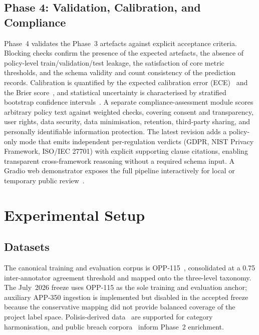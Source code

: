 \documentclass[conference]{IEEEtran}
\begin{document}
\subsection{Phase 4: Validation, Calibration, and Compliance}\label{sec:phase4}
Phase~4 validates the Phase~3 artefacts against explicit acceptance criteria.
Blocking checks confirm the presence of the expected artefacts, the absence
of policy-level train/validation/test leakage, the satisfaction of core
metric thresholds, and the schema validity and count consistency of the
prediction records. Calibration is quantified by the expected calibration
error (ECE)~\cite{guo2017calibration} and the Brier
score~\cite{brier1950verification}, and statistical uncertainty is
characterised by stratified bootstrap confidence
intervals~\cite{efron1993bootstrap}. A separate compliance-assessment module
scores arbitrary policy text against weighted checks, covering consent and
transparency, user rights, data security, data minimisation, retention,
third-party sharing, and personally identifiable information protection.
The latest revision adds a policy-only mode that emits independent
per-regulation verdicts (GDPR, NIST Privacy Framework, ISO/IEC 27701)
with explicit supporting clause citations, enabling transparent
cross-framework reasoning without a required schema input. A Gradio web
demonstrator exposes the full pipeline interactively for local or temporary
public review~\cite{gradio_docs,huggingface_spaces_docs}.

\section{Experimental Setup}\label{sec:setup}
\subsection{Datasets}
The canonical training and evaluation corpus is OPP-115~\cite{wilson2016opp115,opp115_dataset},
consolidated at a 0.75 inter-annotator agreement threshold and mapped onto
the three-level taxonomy. The July~2026 freeze uses OPP-115 as the sole
training and evaluation anchor; auxiliary APP-350 ingestion is implemented
but disabled in the accepted freeze because the conservative mapping did not
provide balanced coverage of the project label space. Polisis-derived
data~\cite{harkous2018polisis} are supported for category harmonisation, and
public breach corpora~\cite{enisa_tl_2024,prc_breaches} inform Phase~2 enrichment.
\end{document}
